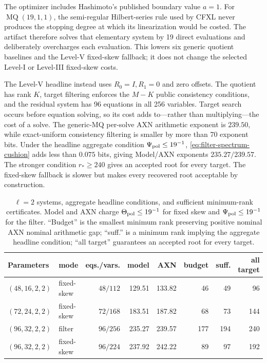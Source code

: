 \documentclass[11pt]{article}
\begin{document}
The optimizer includes Hashimoto's published boundary value $a=1$.  For
$\operatorname{MQ}(19,1,1)$, the semi-regular Hilbert-series rule used by CFXL
never produces the stopping degree at which its linearization would be costed.
The artifact therefore solves that elementary system by 19 direct evaluations
and deliberately overcharges each evaluation.  This
lowers six generic quotient baselines and the Level-V fixed-skew fallback; it
does not change the selected Level-I or Level-III fixed-skew costs.

The Level-V headline instead uses $R_0=I,R_1=0$ and zero offsets.  The quotient
has rank $K$, target filtering enforces the $M-K$ public consistency
conditions, and the residual system has 96 equations in all 256 variables.
Target search occurs before equation solving, so its cost adds to---rather than
multiplying---the cost of a solve.  The generic-MQ per-solve AXN arithmetic
exponent is $239.50$, while exact-uniform consistency filtering is smaller by
more than 70 exponent bits.  Under the headline aggregate condition $\Psi_{\rm pol}\le19^{-1}$,
\eqref{eq:filter-spectrum-cushion} adds less than $0.075$ bits, giving Model/AXN
exponents $235.27/239.57$.  The stronger condition $r_*\ge240$ gives an
accepted root for every target.  The fixed-skew fallback is slower but makes
every recovered root acceptable by construction.

\begin{table}[tbp]
\centering
\caption{$\ell=2$ systems, aggregate headline conditions, and sufficient
minimum-rank certificates.  Model and AXN charge
$\Theta_{\rm pol}\le19^{-1}$ for fixed skew and
$\Psi_{\rm pol}\le19^{-1}$ for the filter.  ``Budget'' is the smallest
minimum rank preserving positive nominal AXN nominal arithmetic gap; ``suff.'' is a
minimum rank implying the aggregate headline condition; ``all target''
guarantees an accepted root for every target.}
\label{tab:l2-costs}
\footnotesize
\setlength{\tabcolsep}{2.15pt}
\begin{tabular}{@{}l l r r r r r r@{}}
\toprule
Parameters & mode & eqs./vars. & model & AXN & budget & suff. & \shortstack{all\\target}\\
\midrule
$(48,16,2,2)$ & fixed-skew & $48/112$ & 129.51 & 133.82 & 46  & 49  & 96\\
$(72,24,2,2)$ & fixed-skew & $72/168$ & 183.51 & 187.82 & 68  & 73  & 144\\
$(96,32,2,2)$ & filter     & $96/256$ & 235.27 & 239.57 & 177 & 194 & 240\\
$(96,32,2,2)$ & fixed-skew & $96/224$ & 237.92 & 242.22 & 89  & 97  & 192\\
\bottomrule
\end{tabular}
\end{table}
\end{document}
